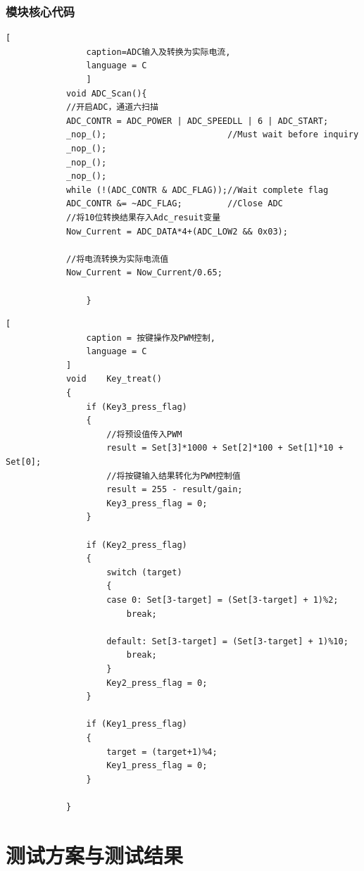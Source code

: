 \documentclass{zjureport}
\begin{document}
            \subsubsection{模块核心代码}
            \begin{lstlisting}[
                caption=ADC输入及转换为实际电流,
                language = C
                ]
            void ADC_Scan(){
            //开启ADC，通道六扫描
            ADC_CONTR = ADC_POWER | ADC_SPEEDLL | 6 | ADC_START;
            _nop_();                        //Must wait before inquiry
            _nop_();
            _nop_();
            _nop_();
            while (!(ADC_CONTR & ADC_FLAG));//Wait complete flag
            ADC_CONTR &= ~ADC_FLAG;         //Close ADC
            //将10位转换结果存入Adc_resuit变量
            Now_Current = ADC_DATA*4+(ADC_LOW2 && 0x03);
                
            //将电流转换为实际电流值
            Now_Current = Now_Current/0.65;
                    
                }
            \end{lstlisting}
            \newpage
            \begin{lstlisting}[
                caption = 按键操作及PWM控制,
                language = C
            ]
            void	Key_treat()
            {
                if (Key3_press_flag)
                {
                    //将预设值传入PWM
                    result = Set[3]*1000 + Set[2]*100 + Set[1]*10 + Set[0];
                    //将按键输入结果转化为PWM控制值
                    result = 255 - result/gain;
                    Key3_press_flag = 0;
                }
            
                if (Key2_press_flag)
                {
                    switch (target)
                    {	
                    case 0: Set[3-target] = (Set[3-target] + 1)%2;
                        break;
                    
                    default: Set[3-target] = (Set[3-target] + 1)%10;
                        break;
                    }
                    Key2_press_flag = 0;
                }
            
                if (Key1_press_flag)
                {
                    target = (target+1)%4;
                    Key1_press_flag = 0;
                }
            
            }
            \end{lstlisting}
            \newpage
    \section{测试方案与测试结果}
\end{document}
